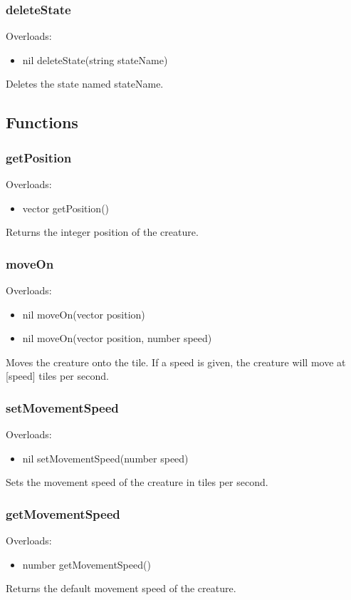 \documentclass{book}
\newenvironment{ulist}
	{\begin{itemize}
			\itemsep0em}
	{\end{itemize}}
\begin{document}
\subsubsection{deleteState}
Overloads:
\begin{ulist}
	\item nil deleteState(string stateName)
\end{ulist}
Deletes the state named stateName.


\subsection{Functions}
\subsubsection{getPosition}
Overloads:
\begin{ulist}
	\item vector getPosition()
\end{ulist}
Returns the integer position of the creature.

\subsubsection{moveOn}
Overloads:
\begin{ulist}
	\item nil moveOn(vector position)
	\item nil moveOn(vector position, number speed)
\end{ulist}
Moves the creature onto the tile. If a speed is given, the creature will move at [speed] tiles per second.

\subsubsection{setMovementSpeed}
Overloads:
\begin{ulist}
	\item nil setMovementSpeed(number speed)
\end{ulist}
Sets the movement speed of the creature in tiles per second.

\subsubsection{getMovementSpeed}
Overloads:
\begin{ulist}
	\item number getMovementSpeed()
\end{ulist}
Returns the default movement speed of the creature.
\end{document}
